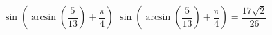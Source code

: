  {$\sin\left(\arcsin\left( \dfrac{5}{13} \right) + \dfrac{\pi}{4}\right)$}
{ $\sin\left(\arcsin\left( \dfrac{5}{13} \right) + \dfrac{\pi}{4}\right) = \dfrac{17\sqrt{2}}{26}$}
